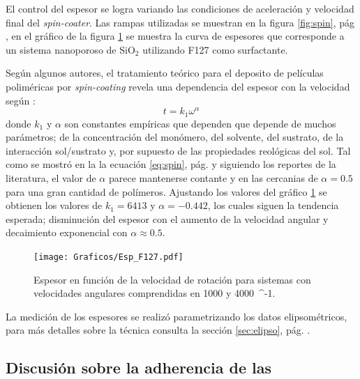 		El control del espesor se logra variando las condiciones de aceleración y velocidad final del \textit{spin-coater}. Las rampas utilizadas se muestran en la figura \ref{fig:spin}, pág \pageref{fig:spin}, en el gráfico de la figura \ref{fig:esp} se muestra la curva de espesores que corresponde a un sistema nanoporoso de SiO$_2$ utilizando F127 como surfactante. 

		Según algunos autores, el tratamiento teórico para el deposito de películas poliméricas por \textit{spin-coating} revela una dependencia del espesor con la velocidad según \cite{Norrman2005,Meyerhofer1978,Bornside1989,Lora1990}:
						\begin{equation}
			 			    t = k_1 \omega^{\alpha}
			 		    	 \label{eq:spin_meso}
							\end{equation}
		donde $k_1$ y $\alpha$ son constantes empíricas que dependen que depende de muchos parámetros; de la concentración del monómero, del solvente, del sustrato, de la interacción sol/sustrato y, por supuesto de las propiedades reológicas del sol. Tal como se mostró en la la ecuación \ref{eq:spin}, pág. \pageref{eq:spin} y siguiendo los reportes de la literatura, el valor de $\alpha$ parece mantenerse contante y en las cercanias de $\alpha=0.5$ para una gran cantidad de polímeros. Ajustando los valores del gráfico \ref{fig:esp} se obtienen los valores de $k_1=6413$ y  $\alpha=-0.442$, los cuales siguen la tendencia esperada; disminución del espesor con el aumento de la velocidad angular y decaimiento exponencial con $\alpha \approx 0.5$. 
			\begin{figure}[!ht]
						\begin{center}
						\texttt{[image: Graficos/Esp\_F127.pdf]}
						\caption[Espesor en función de la velocidad de rotación.]{Espesor en función de la velocidad de rotación para sistemas \pdmF con velocidades angulares comprendidas en 1000 y \SI{4000}{\minute^{-1}.}}
						\label{fig:esp}
						\end{center}
						\end{figure}

		La medición de los espesores se realizó parametrizando los datos elipsométricos, para más detalles sobre la técnica consulta la sección \ref{sec:elipso}, pág. \pageref{sec:elipso}.
		
	\subsection{Discusión sobre la adherencia de las \pdm}	

